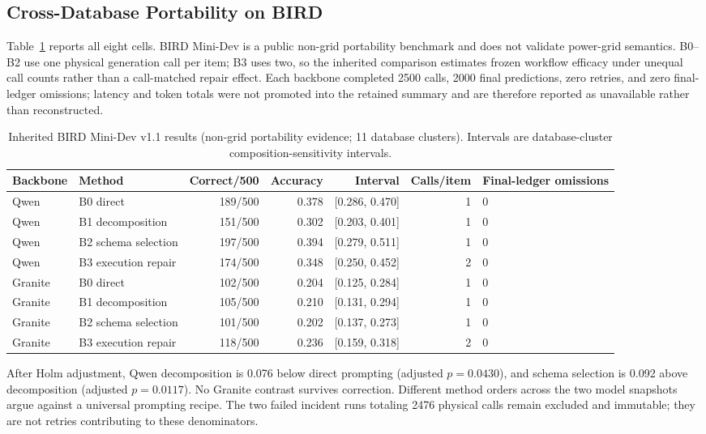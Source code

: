 \documentclass[applsci,article,submit,moreauthors]{Definitions/mdpi}
\begin{document}
\subsection{Cross-Database Portability on BIRD}

Table~\ref{tab:bird} reports all eight cells. BIRD Mini-Dev is a public non-grid portability benchmark and does not validate power-grid semantics. B0--B2 use one physical generation call per item; B3 uses two, so the inherited comparison estimates frozen workflow efficacy under unequal call counts rather than a call-matched repair effect. Each backbone completed 2500 calls, 2000 final predictions, zero retries, and zero final-ledger omissions; latency and token totals were not promoted into the retained summary and are therefore reported as unavailable rather than reconstructed.

\begin{table}[htbp]
\caption{Inherited BIRD Mini-Dev v1.1 results (non-grid portability evidence; 11 database clusters). Intervals are database-cluster composition-sensitivity intervals.}
\label{tab:bird}
\centering
\small
\setlength{\tabcolsep}{3pt}
\begin{tabular}{llrrrrp{1.5cm}}
\toprule
Backbone & Method & Correct/500 & Accuracy & Interval & Calls/item & Final-ledger omissions\\
\midrule
Qwen & B0 direct & 189/500 & 0.378 & [0.286, 0.470] & 1 & 0\\
Qwen & B1 decomposition & 151/500 & 0.302 & [0.203, 0.401] & 1 & 0\\
Qwen & B2 schema selection & 197/500 & 0.394 & [0.279, 0.511] & 1 & 0\\
\cmidrule(lr){1-7}
Qwen & B3 execution repair & 174/500 & 0.348 & [0.250, 0.452] & 2 & 0\\
Granite & B0 direct & 102/500 & 0.204 & [0.125, 0.284] & 1 & 0\\
Granite & B1 decomposition & 105/500 & 0.210 & [0.131, 0.294] & 1 & 0\\
Granite & B2 schema selection & 101/500 & 0.202 & [0.137, 0.273] & 1 & 0\\
\cmidrule(lr){1-7}
Granite & B3 execution repair & 118/500 & 0.236 & [0.159, 0.318] & 2 & 0\\
\bottomrule
\end{tabular}
\end{table}

After Holm adjustment, Qwen decomposition is 0.076 below direct prompting (adjusted $p=0.0430$), and schema selection is 0.092 above decomposition (adjusted $p=0.0117$). No Granite contrast survives correction. Different method orders across the two model snapshots argue against a universal prompting recipe. The two failed incident runs totaling 2476 physical calls remain excluded and immutable; they are not retries contributing to these denominators.
\end{document}
